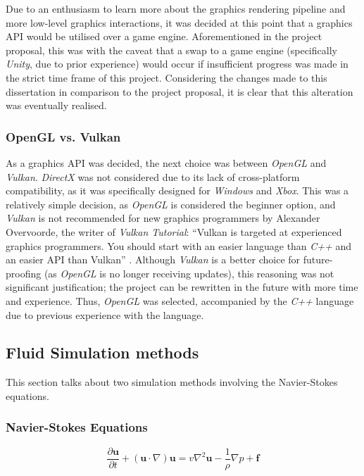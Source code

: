 \documentclass[a4paper, 12pt]{article}
\begin{document}
    Due to an enthusiasm to learn more about the graphics rendering pipeline and more low-level graphics interactions, it was decided at this point that a graphics API would be utilised over a game engine. Aforementioned in the project proposal, this was with the caveat that a swap to a game engine (specifically \textit{Unity}, due to prior experience) would occur if insufficient progress was made in the strict time frame of this project. Considering the changes made to this dissertation in comparison to the project proposal, it is clear that this alteration was eventually realised.

    \subsubsection{OpenGL vs. Vulkan}

    As a graphics API was decided, the next choice was between \textit{OpenGL} and \textit{Vulkan}. \textit{DirectX} was not considered due to its lack of cross-platform compatibility, as it was specifically designed for \textit{Windows} and \textit{Xbox}. This was a relatively simple decision, as \textit{OpenGL} is considered the beginner option, and \textit{Vulkan} is not recommended for new graphics programmers by Alexander Overvoorde, the writer of \textit{Vulkan Tutorial}: ``Vulkan is targeted at experienced graphics programmers. You should start with an easier language than \textit{C++} and an easier API than Vulkan'' \cite{vulkancomment}. Although \textit{Vulkan} is a better choice for future-proofing (as \textit{OpenGL} is no longer receiving updates), this reasoning was not significant justification; the project can be rewritten in the future with more time and experience. Thus, \textit{OpenGL} was selected, accompanied by the \textit{C++} language due to previous experience with the language.
    
    \subsection{Fluid Simulation methods}

    This section talks about two simulation methods involving the Navier-Stokes equations.

    \subsubsection{Navier-Stokes Equations}

    \begin{equation}
        \frac{\partial{\textbf{u}}}{\partial{t}} + (\textbf{u} \cdot\nabla)\textbf{u} = v\nabla^2 \textbf{u} - \frac{1}{\rho}\nabla p + \textbf{f}
    \end{equation}
\end{document}
